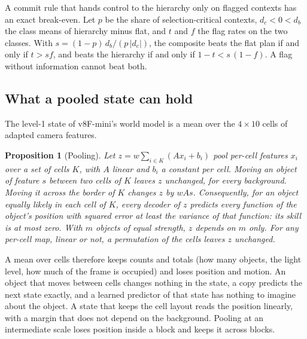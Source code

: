 \documentclass[10pt,twocolumn]{article}
\newtheorem{proposition}{Proposition}
\theoremstyle{remark}
\begin{document}
A commit rule that hands control to the hierarchy only on flagged contexts has an exact break-even. Let $p$ be the share of
selection-critical contexts, $d_c<0<d_b$ the class means of hierarchy minus flat, and $t$ and $f$ the flag rates on the two classes.
With $s=(1-p)\,d_b/(p\,|d_c|)$, the composite beats the flat plan if and only if $t>s f$, and beats the hierarchy if and only if
$1-t<s\,(1-f)$. A flag without information cannot beat both.

\subsection{What a pooled state can hold}
The level-1 state of v8F-mini's world model is a mean over the $4\times10$ cells of adapted camera features.
\begin{proposition}[Pooling]\label{prop:pool}
Let $z=w\sum_{i\in K}(Ax_i+b_i)$ pool per-cell features $x_i$ over a set of cells $K$, with $A$ linear and $b_i$ a constant per cell.
Moving an object of feature $s$ between two cells of $K$ leaves $z$ unchanged, for every background. Moving it across the border of
$K$ changes $z$ by $wAs$. Consequently, for an object equally likely in each cell of $K$, every decoder of $z$ predicts every function
of the object's position with squared error at least the variance of that function: its skill is at most zero. With $m$ objects of
equal strength, $z$ depends on $m$ only. For any per-cell map, linear or not, a permutation of the cells leaves $z$ unchanged.
\end{proposition}
\noindent A mean over cells therefore keeps counts and totals (how many objects, the light level, how much of the frame is occupied)
and loses position and motion. An object that moves between cells changes nothing in the state, a copy predicts the next state
exactly, and a learned predictor of that state has nothing to imagine about the object. A state that keeps the cell layout reads the
position linearly, with a margin that does not depend on the background. Pooling at an intermediate scale loses position inside a
block and keeps it across blocks.
\end{document}
